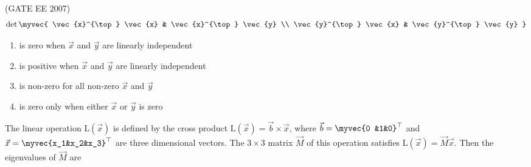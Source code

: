 \hfill{(GATE EE 2007)} 
$$
\det\myvec{
\vec{x}^{\top} \vec{x} & \vec{x}^{\top} \vec{y} \\
\vec{y}^{\top} \vec{x} & \vec{y}^{\top} \vec{y} 
}
$$
\begin{enumerate}
\item is zero when $\vec{x}$ and $\vec{y}$ are linearly independent
\item is positive when $\vec{x}$ and $\vec{y}$ are linearly independent
\item is non-zero for all non-zero $\vec{x}$ and $\vec{y}$
\item is zero only when either $\vec{x}$ or $\vec{y}$ is zero
\end{enumerate}
%
\item  The linear operation $\mathrm{L}(\vec{x})$ is defined by the cross product $\mathrm{L}(\vec{x}) = \vec{b} \times \vec{x}$, where $\vec{b} = \myvec{0 &1&0}^{\top}$ and $\vec{x} = \myvec{x_1&x_2&x_3}^{\top}$ are three dimensional vectors. The $3 \times 3$ matrix $\vec{M}$ of this operation satisfies
$
    \mathrm{L}(\vec{x}) = \vec{M}\vec{x}.     
$
Then the eigenvalues of $\vec{M}$ are 

